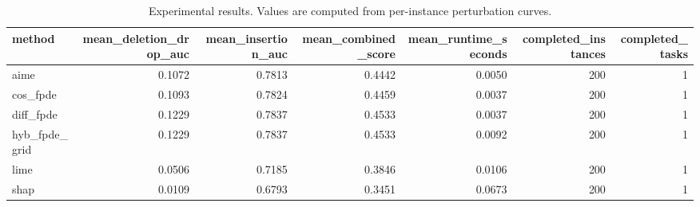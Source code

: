 \begin{table}[t]
\caption{Experimental results. Values are computed from per-instance perturbation curves.}
\label{tab:main_results_computed}
\centering
\begin{tabular}{lrrrrrr}
\toprule
method & mean\_deletion\_drop\_auc & mean\_insertion\_auc & mean\_combined\_score & mean\_runtime\_seconds & completed\_instances & completed\_tasks \\
\midrule
aime & 0.1072 & 0.7813 & 0.4442 & 0.0050 & 200 & 1 \\
cos\_fpde & 0.1093 & 0.7824 & 0.4459 & 0.0037 & 200 & 1 \\
diff\_fpde & 0.1229 & 0.7837 & 0.4533 & 0.0037 & 200 & 1 \\
hyb\_fpde\_grid & 0.1229 & 0.7837 & 0.4533 & 0.0092 & 200 & 1 \\
lime & 0.0506 & 0.7185 & 0.3846 & 0.0106 & 200 & 1 \\
shap & 0.0109 & 0.6793 & 0.3451 & 0.0673 & 200 & 1 \\
\bottomrule
\end{tabular}

\end{table}
